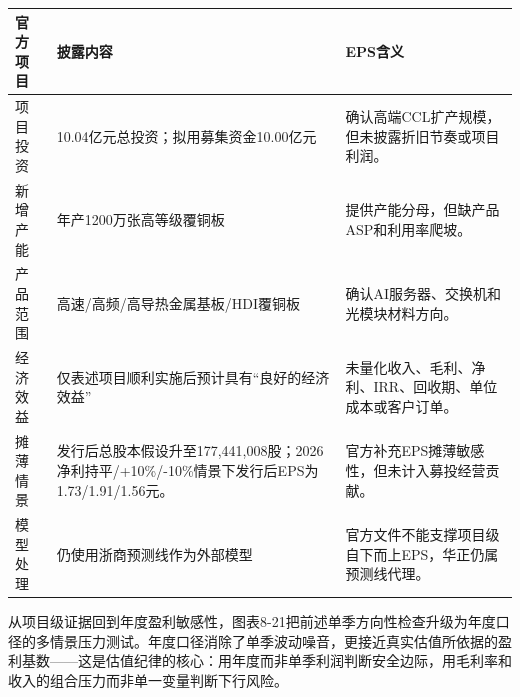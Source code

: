 \begin{exhibitbox}[图表8-20：华正高等级CCL项目边界]
\footnotesize
\begin{tabularx}{\textwidth}{L{3.0cm}L{3.0cm}X}
\toprule
\textbf{官方项目} & \textbf{披露内容} & \textbf{EPS含义} \\
\midrule
项目投资 & 10.04亿元总投资；拟用募集资金10.00亿元 & 确认高端CCL扩产规模，但未披露折旧节奏或项目利润。 \\
新增产能 & 年产1200万张高等级覆铜板 & 提供产能分母，但缺产品ASP和利用率爬坡。 \\
产品范围 & 高速/高频/高导热金属基板/HDI覆铜板 & 确认AI服务器、交换机和光模块材料方向。 \\
经济效益 & 仅表述项目顺利实施后预计具有``良好的经济效益'' & 未量化收入、毛利、净利、IRR、回收期、单位成本或客户订单。 \\
摊薄情景 & 发行后总股本假设升至177,441,008股；2026净利持平/+10\%/-10\%情景下发行后EPS为1.73/1.91/1.56元。 & 官方补充EPS摊薄敏感性，但未计入募投经营贡献。 \\
模型处理 & 仍使用浙商预测线作为外部模型 & 官方文件不能支撑项目级自下而上EPS，华正仍属预测线代理。 \\
\bottomrule
\end{tabularx}
\end{exhibitbox}

从项目级证据回到年度盈利敏感性，图表8-21把前述单季方向性检查升级为年度口径的多情景压力测试。年度口径消除了单季波动噪音，更接近真实估值所依据的盈利基数——这是估值纪律的核心：用年度而非单季利润判断安全边际，用毛利率和收入的组合压力而非单一变量判断下行风险。

